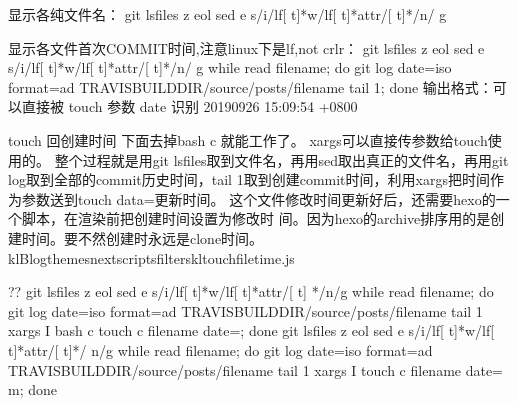 \documentclass[letterpaper,12pt,english]{sphinxmanual}
\begin{document}
\begin{sphinxVerbatim}[commandchars=\\\{\}]
显示各纯文件名：
git ls\PYGZhy{}files \PYGZhy{}z \PYGZhy{}\PYGZhy{}eol \textbar{} sed \PYGZhy{}e \PYGZdq{}s/i\PYGZbs{}/lf[ \PYGZbs{}t]*w\PYGZbs{}/lf[ \PYGZbs{}t]*attr\PYGZbs{}/[ \PYGZbs{}t]*/\PYGZbs{}n/  g\PYGZdq{}

显示各文件首次COMMIT时间,注意linux下是lf,not crlr：
git ls\PYGZhy{}files \PYGZhy{}z \PYGZhy{}\PYGZhy{}eol \textbar{} sed \PYGZhy{}e \PYGZdq{}s/i\PYGZbs{}/lf[ \PYGZbs{}t]*w\PYGZbs{}/lf[ \PYGZbs{}t]*attr\PYGZbs{}/[ \PYGZbs{}t]*/\PYGZbs{}n/  g\PYGZdq{} \textbar{} while read filename; do git log \PYGZhy{}\PYGZhy{}date=iso \PYGZhy{}\PYGZhy{}format=\PYGZdq{}\PYGZpc{}ad\PYGZdq{} \PYGZhy{}\PYGZhy{}   \PYGZdq{}\PYGZdl{}TRAVIS\PYGZus{}BUILD\PYGZus{}DIR/source/\PYGZus{}posts/\PYGZdl{}filename\PYGZdq{} \textbar{} tail \PYGZhy{}1; done
输出格式：可以直接被 touch 参数 \PYGZhy{}\PYGZhy{}date \PYGZdq{}\PYGZdq{}识别
2019\PYGZhy{}09\PYGZhy{}26 15:09:54 +0800

\PYGZsh{} touch 回创建时间
\PYGZsh{} 下面去掉bash \PYGZhy{}c 就能工作了。 xargs可以直接传参数给touch使用的。
\PYGZsh{} 整个过程就是用git ls\PYGZhy{}files取到文件名，再用sed取出真正的文件名，再用git   log取到全部的commit历史时间，tail   \PYGZhy{}1取到创建commit时间，利用xargs把时间作为参数送到touch \PYGZhy{}data=\PYGZdq{}\PYGZdq{}更新时间。
\PYGZsh{} 这个文件修改时间更新好后，还需要hexo的一个脚本，在渲染前把创建时间设置为修改时  间。因为hexo的archive排序用的是创建时间。要不然创建时永远是clone时间。
\PYGZsh{} klBlog\PYGZbs{}themes\PYGZbs{}next\PYGZbs{}scripts\PYGZbs{}filters\PYGZbs{}kl\PYGZhy{}touch\PYGZhy{}file\PYGZhy{}time.js

\PYGZsh{} ?? \PYGZhy{} git ls\PYGZhy{}files \PYGZhy{}z \PYGZhy{}\PYGZhy{}eol \textbar{} sed \PYGZhy{}e \PYGZdq{}s/i\PYGZbs{}/lf[ \PYGZbs{}t]*w\PYGZbs{}/lf[ \PYGZbs{}t]*attr\PYGZbs{}/[ \PYGZbs{}t]  */\PYGZbs{}n/g\PYGZdq{} \textbar{} while read filename; do git log \PYGZhy{}\PYGZhy{}date=iso \PYGZhy{}\PYGZhy{}format=\PYGZdq{}\PYGZpc{}ad\PYGZdq{} \PYGZhy{}\PYGZhy{}   \PYGZdq{}\PYGZdl{}TRAVIS\PYGZus{}BUILD\PYGZus{}DIR/source/\PYGZus{}posts/\PYGZdl{}filename\PYGZdq{} \textbar{} tail \PYGZhy{}1 \textbar{} xargs \PYGZhy{}I\PYGZob{}\PYGZcb{} bash   \PYGZhy{}c \PYGZsq{}touch \PYGZhy{}c \PYGZdl{}filename \PYGZhy{}\PYGZhy{}date=\PYGZdq{}\PYGZob{}\PYGZcb{}\PYGZdq{}\PYGZsq{}; done
  \PYGZhy{} git ls\PYGZhy{}files \PYGZhy{}z \PYGZhy{}\PYGZhy{}eol \textbar{} sed \PYGZhy{}e \PYGZdq{}s/i\PYGZbs{}/lf[ \PYGZbs{}t]*w\PYGZbs{}/lf[ \PYGZbs{}t]*attr\PYGZbs{}/[ \PYGZbs{}t]*/  \PYGZbs{}n/g\PYGZdq{} \textbar{} while read filename; do git log \PYGZhy{}\PYGZhy{}date=iso \PYGZhy{}\PYGZhy{}format=\PYGZdq{}\PYGZpc{}ad\PYGZdq{} \PYGZhy{}\PYGZhy{}   \PYGZdq{}\PYGZdl{}TRAVIS\PYGZus{}BUILD\PYGZus{}DIR/source/\PYGZus{}posts/\PYGZdl{}filename\PYGZdq{} \textbar{} tail \PYGZhy{}1 \textbar{} xargs \PYGZhy{}I\PYGZob{}\PYGZcb{}   touch \PYGZhy{}c \PYGZdl{}filename \PYGZhy{}\PYGZhy{}date=\PYGZdq{}\PYGZob{}\PYGZcb{}\PYGZdq{} \PYGZhy{}m; done
\end{sphinxVerbatim}
\end{document}
